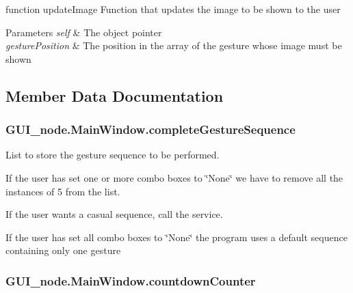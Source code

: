 function update\+Image Function that updates the image to be shown to the user 


\begin{DoxyParams}{Parameters}
{\em self} & The object pointer \\
\hline
{\em gesture\+Position} & The position in the array of the gesture whose image must be shown \\
\hline
\end{DoxyParams}


\subsection{Member Data Documentation}
\subsubsection[{\texorpdfstring{complete\+Gesture\+Sequence}{completeGestureSequence}}]{\setlength{\rightskip}{0pt plus 5cm}G\+U\+I\+\_\+node.\+Main\+Window.\+complete\+Gesture\+Sequence}\hypertarget{classGUI__node_1_1MainWindow_ad50097b037ad87eeef2243f2ec4194dd}{}\label{classGUI__node_1_1MainWindow_ad50097b037ad87eeef2243f2ec4194dd}


List to store the gesture sequence to be performed. 

If the user has set one or more combo boxes to \char`\"{}\+None\char`\"{} we have to remove all the instances of 5 from the list.

If the user wants a casual sequence, call the service.

If the user has set all combo boxes to \char`\"{}\+None\char`\"{} the program uses a default sequence containing only one gesture 
\subsubsection[{\texorpdfstring{countdown\+Counter}{countdownCounter}}]{\setlength{\rightskip}{0pt plus 5cm}G\+U\+I\+\_\+node.\+Main\+Window.\+countdown\+Counter}\hypertarget{classGUI__node_1_1MainWindow_a4825057b1cb23f32b6263046b6cced7a}{}\label{classGUI__node_1_1MainWindow_a4825057b1cb23f32b6263046b6cced7a}


